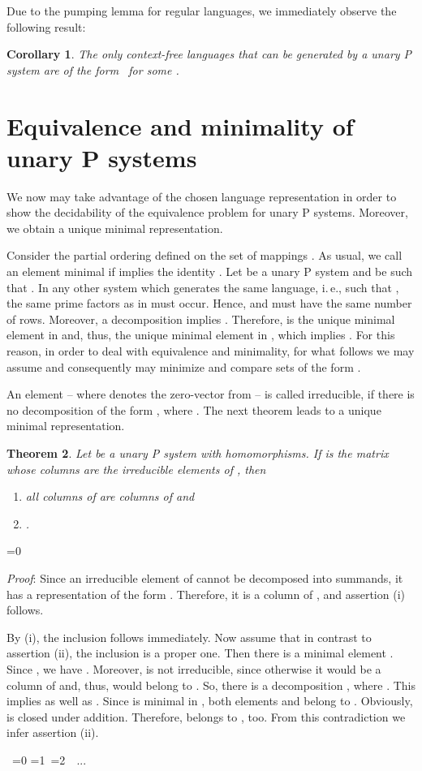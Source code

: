 \documentclass[copyright]{eptcs}
\makeatletter
\newtheorem{theorem}{Theorem}
\newtheorem{corollary}[theorem]{Corollary}
\newcounter{d@proof}\let\thed@proof\relax\setcounter{d@proof}{0}
\newcommand*{\qed}{}
\newenvironment{proof}{\ifnum \value{d@proof}=0{\setcounter{claim}{0}}\else\fi
  \stepcounter{d@proof}\par\noindent
  {\rmfamily\itshape\mdseries Proof\/}:\hspace{\labelsep}\ignorespaces}{\addtocounter{d@proof}{-1}\mbox{}\nolinebreak\hfill~\ifnum \value{d@proof}=0{\qed}\else
    \ifnum \value{d@proof}=1{\qed\nolinebreak\,\nolinebreak\qed}\else
      \ifnum \value{d@proof}=2{\qed\nolinebreak\,\nolinebreak\qed
          \nolinebreak\,\nolinebreak\qed}\else
        {\qed\nolinebreak...\nolinebreak\qed}\fi\fi\fi
  \medbreak
}
\makeatother
\begin{document}
Due to the pumping lemma for regular languages, we immediately observe the
following result:

\begin{corollary}
The only context-free languages that can be generated by a unary P system
are of the form~ for some .
\end{corollary}

\section{Equivalence and minimality of unary P systems}

We now may take advantage of the chosen language representation in order to
show the decidability of the equivalence problem for unary P systems.
Moreover, we obtain a unique minimal representation.

Consider the partial ordering 
defined on the set of mappings . As usual, we call
an element  minimal if  implies the identity . Let  be a unary P system
and  be such that . In any other system  which generates
the same language, i.\,e., 
\hbox{} 
such that , 
the same prime factors as in  must occur. Hence,  and  must have the same number of rows. Moreover, a
decomposition  implies . Therefore,  is the
unique minimal element in  and, thus, the unique minimal element in , which implies . For this reason, in order to
deal with equivalence and minimality, for what follows we may assume 
and consequently may minimize and compare sets of the form .

An element  -- where  denotes the zero-vector from  -- is called
irreducible, if there is no decomposition of the form , where 
. The next
theorem leads to a unique minimal representation.

\begin{theorem}
\label{theo:minimal-representation} Let  be a unary P system with 
homomorphisms. If  is the matrix whose columns are the  irreducible elements of , then 
\begin{enumerate}
\item[\rm (i)] all columns of  are columns of  and 
\item[\rm (ii)] .
\end{enumerate}
\end{theorem}

\begin{proof}
Since an irreducible element of 
cannot be decomposed into summands, it has a representation of the form . Therefore, it is a column of , and assertion (i) follows.

By (i), the inclusion  follows immediately. Now assume that in
contrast to assertion (ii), the inclusion is a proper one. Then there is a
minimal element . Since , we have . Moreover,  is not irreducible, since otherwise it would be a
column of  and, thus, would belong to . So, there is a decomposition \hbox{}, where . This implies  as well as . Since  is minimal in ,
both elements  and  belong to . Obviously, 
is closed under addition. Therefore,  belongs to , too. From this contradiction we infer assertion (ii).
\end{proof}
\end{document}
